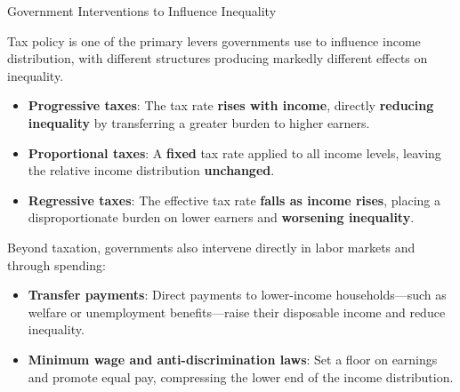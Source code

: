 \documentclass[10pt]{article}
\begin{document}
    \begin{core}{Government Interventions to Influence Inequality}

      Tax policy is one of the primary levers governments use to influence income distribution, with different structures producing markedly different effects on inequality.

      \begin{itemize}

        \item \textbf{Progressive taxes}: The tax rate \textbf{rises with income}, directly \textbf{reducing inequality} by transferring a greater burden to higher earners.

        \item \textbf{Proportional taxes}: A \textbf{fixed} tax rate applied to all income levels, leaving the relative income distribution \textbf{unchanged}.

        \item \textbf{Regressive taxes}: The effective tax rate \textbf{falls as income rises}, placing a disproportionate burden on lower earners and \textbf{worsening inequality}.

      \end{itemize}

      Beyond taxation, governments also intervene directly in labor markets and through spending:

      \begin{itemize}
        
        \item \textbf{Transfer payments}: Direct payments to lower-income households---such as welfare or unemployment benefits---raise their disposable income and reduce inequality.

        \item \textbf{Minimum wage and anti-discrimination laws}: Set a floor on earnings and promote equal pay, compressing the lower end of the income distribution.

      \end{itemize}

    \end{core}
   
\end{document}
